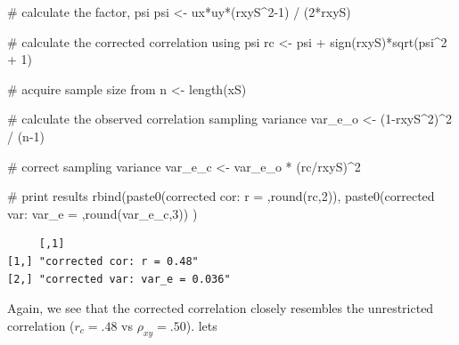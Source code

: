 \documentclass[
  letterpaper,
  DIV=11,
  numbers=noendperiod]{scrreprt}
\newenvironment{Shaded}{\begin{snugshade}}{\end{snugshade}}
\newcommand{\CommentTok}[1]{\textcolor[rgb]{0.37,0.37,0.37}{#1}}
\newcommand{\DecValTok}[1]{\textcolor[rgb]{0.68,0.00,0.00}{#1}}
\newcommand{\FunctionTok}[1]{\textcolor[rgb]{0.28,0.35,0.67}{#1}}
\newcommand{\NormalTok}[1]{\textcolor[rgb]{0.00,0.23,0.31}{#1}}
\newcommand{\OtherTok}[1]{\textcolor[rgb]{0.00,0.23,0.31}{#1}}
\newcommand{\SpecialCharTok}[1]{\textcolor[rgb]{0.37,0.37,0.37}{#1}}
\newcommand{\StringTok}[1]{\textcolor[rgb]{0.13,0.47,0.30}{#1}}
\begin{document}
\begin{Shaded}
\begin{Highlighting}[]
\CommentTok{\# calculate the factor, psi}
\NormalTok{psi }\OtherTok{\textless{}{-}}\NormalTok{ ux}\SpecialCharTok{*}\NormalTok{uy}\SpecialCharTok{*}\NormalTok{(rxyS}\SpecialCharTok{\^{}}\DecValTok{2{-}1}\NormalTok{) }\SpecialCharTok{/}\NormalTok{ (}\DecValTok{2}\SpecialCharTok{*}\NormalTok{rxyS)}

\CommentTok{\# calculate the corrected correlation using psi}
\NormalTok{rc }\OtherTok{\textless{}{-}}\NormalTok{ psi }\SpecialCharTok{+} \FunctionTok{sign}\NormalTok{(rxyS)}\SpecialCharTok{*}\FunctionTok{sqrt}\NormalTok{(psi}\SpecialCharTok{\^{}}\DecValTok{2} \SpecialCharTok{+} \DecValTok{1}\NormalTok{)}

\CommentTok{\# acquire sample size from }
\NormalTok{n }\OtherTok{\textless{}{-}} \FunctionTok{length}\NormalTok{(xS)}

\CommentTok{\# calculate the observed correlation sampling variance}
\NormalTok{var\_e\_o }\OtherTok{\textless{}{-}}\NormalTok{ (}\DecValTok{1}\SpecialCharTok{{-}}\NormalTok{rxyS}\SpecialCharTok{\^{}}\DecValTok{2}\NormalTok{)}\SpecialCharTok{\^{}}\DecValTok{2} \SpecialCharTok{/}\NormalTok{ (n}\DecValTok{{-}1}\NormalTok{)}

\CommentTok{\# correct sampling variance}
\NormalTok{var\_e\_c }\OtherTok{\textless{}{-}}\NormalTok{ var\_e\_o }\SpecialCharTok{*}\NormalTok{ (rc}\SpecialCharTok{/}\NormalTok{rxyS)}\SpecialCharTok{\^{}}\DecValTok{2}

\CommentTok{\# print results}
\FunctionTok{rbind}\NormalTok{(}\FunctionTok{paste0}\NormalTok{(}\StringTok{\textquotesingle{}corrected cor: r = \textquotesingle{}}\NormalTok{,}\FunctionTok{round}\NormalTok{(rc,}\DecValTok{2}\NormalTok{)),}
      \FunctionTok{paste0}\NormalTok{(}\StringTok{\textquotesingle{}corrected var: var\_e = \textquotesingle{}}\NormalTok{,}\FunctionTok{round}\NormalTok{(var\_e\_c,}\DecValTok{3}\NormalTok{))}
\NormalTok{      )}
\end{Highlighting}
\end{Shaded}

\begin{verbatim}
     [,1]                          
[1,] "corrected cor: r = 0.48"     
[2,] "corrected var: var_e = 0.036"
\end{verbatim}

Again, we see that the corrected correlation closely resembles the
unrestricted correlation (\(r_c=.48\) vs \(\rho_{xy}=.50\)). lets
\end{document}
